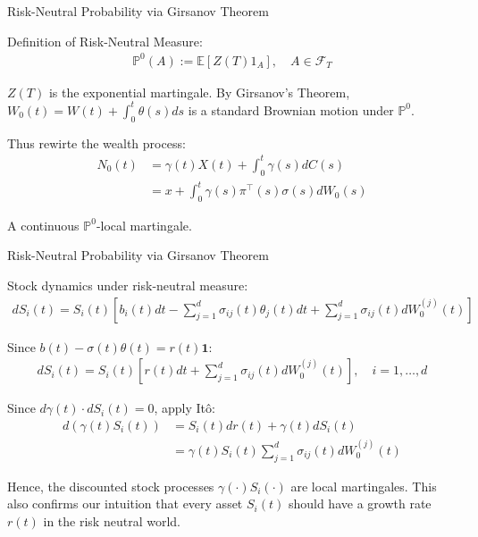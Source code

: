 \documentclass{beamer}
\begin{document}
 

\begin{frame}{Risk-Neutral Probability via Girsanov Theorem}

    {\footnotesize \footnotesize
    \par Definition of Risk-Neutral Measure:
    \begin{align*}
         \mathbb{P}^{0}(A) := \mathbb{E}[Z(T)1_{A}], \quad A \in \mathcal{F}_{T}
    \end{align*}
    \par $Z(T)$ is the exponential martingale. By Girsanov's Theorem, $ W_{0}(t) = W(t) + \int_{0}^{t} \theta(s) ds$ 
    is a standard Brownian motion under $\mathbb{P}^{0}$.
    \par  \pause Thus rewirte the wealth process:
    \begin{align*}
         N_{0}(t) &= \gamma(t)X(t) + \int_{0}^{t} \gamma(s)dC(s) \\
    &= x + \int_{0}^{t} \gamma(s)\pi^{\top}(s)\sigma(s) dW_{0}(s)
    \end{align*}
    \par A continuous $\mathbb{P}^{0}$-local martingale.
    }   
\end{frame} 

\begin{frame}{Risk-Neutral Probability via Girsanov Theorem}

    {\footnotesize \footnotesize
    \par Stock dynamics under risk-neutral measure:
    \begin{align*}
        dS_i(t) = S_i(t) \left[ b_i(t)dt - \sum_{j=1}^d \sigma_{ij}(t)\theta_j(t)dt + \sum_{j=1}^d \sigma_{ij}(t)dW_0^{(j)}(t) \right]
    \end{align*}
    \par Since $b(t) - \sigma(t)\theta(t) = r(t)\mathbf{1}$:
    \begin{align*}
        dS_i(t) = S_i(t) \left[r(t)dt + \sum_{j=1}^d \sigma_{ij}(t)dW_0^{(j)}(t) \right], \quad i = 1, \ldots, d
    \end{align*}
    \par  \pause Since $d\gamma(t) \cdot dS_i(t) = 0$, apply Itô:
    \begin{align*}
        d(\gamma(t)S_i(t)) &= S_i(t)dr(t) + \gamma(t)dS_i(t) \\
        &= \gamma(t)S_i(t) \sum_{j=1}^d \sigma_{ij}(t)dW_0^{(j)}(t)
    \end{align*}
    \par  \pause  Hence, the discounted stock processes $\gamma(\cdot)S_i(\cdot)$ are local martingales.
     This also confirms our intuition that every asset $S_i(t)$ should have a growth rate $r(t)$ in the risk neutral world.
    }   
\end{frame} 
\end{document}
